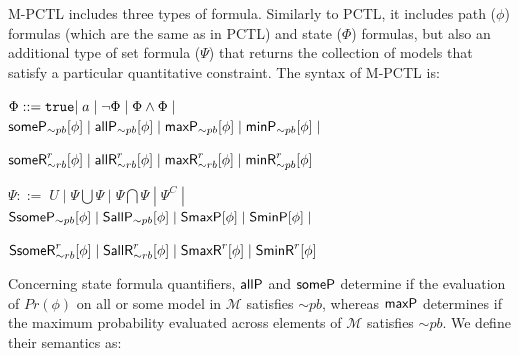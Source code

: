 \documentclass[10pt,journal,compsoc]{IEEEtran}
\begin{document}
M-PCTL includes three types of formula. Similarly to PCTL, it includes path ($\phi$) formulas (which are the same as in PCTL) and state ($\Phi$) formulas, but also an additional type of set formula ($\Psi$) that returns the collection of models that satisfy a particular quantitative constraint.
The syntax of M-PCTL is:
\begin{center}
$\Phi ::= {\tt true} | \; a \;  | \; \neg \Phi \; | \; \Phi \wedge \Phi \; |$ \\ 

\smallskip
${\sf someP}_{\sim pb} [\phi] \; | \; {\sf allP}_{\sim pb} [\phi] \; | \; {\sf maxP}_{\sim pb} [\phi] \; | \; {\sf minP}_{\sim pb} [\phi] \; |$ 

\smallskip
${\sf someR}^r_{\sim rb} [\phi] \; | \; {\sf allR}^r_{\sim rb} [\phi] \; | \; {\sf maxR}^r_{\sim rb} [\phi] \; | \; {\sf minR}^r_{\sim pb} [\phi]$ 

\smallskip
$\Psi ::= \; U \;  | \; \Psi \bigcup \Psi \; | \; \Psi \bigcap \Psi \; | \; \Psi^C \; |$ \\ 

\smallskip
${\sf SsomeP}_{\sim pb} [\phi] \; | \; {\sf SallP}_{\sim pb} [\phi] \; | \; {\sf SmaxP} [\phi] \; | \; {\sf SminP} [\phi] \; |$ 

\smallskip
${\sf SsomeR}^r_{\sim rb} [\phi] \; | \; {\sf SallR}^r_{\sim rb} [\phi] \; | \; {\sf SmaxR}^r [\phi] \; | \; {\sf SminR}^r [\phi]$ 
\end{center}
 Concerning state formula quantifiers, ${\sf allP}$ and ${\sf someP}$ determine if the evaluation of $Pr(\phi)$ on all or some model in $\mathcal{M}$ satisfies $\sim pb$, whereas ${\sf maxP}$ determines if the maximum probability evaluated across elements of $\mathcal{M}$ satisfies $\sim pb$. 
We define their semantics as:
\end{document}
